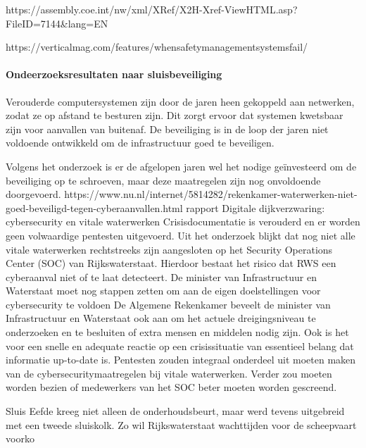 https://assembly.coe.int/nw/xml/XRef/X2H-Xref-ViewHTML.asp?FileID=7144&lang=EN
\cite{fulvio1993safetycriticalsystems}
\cite{dlrtabid}
\cite{knight2010SafetyCritical}
\cite{creavisafecritical}
\cite{valdes2018SafetybyAutomation}

https://verticalmag.com/features/whensafetymanagementsystemsfail/
\cite{2015whensafetymanagementsystemsfail}
\paragraph{Ondeerzoeksresultaten naar sluisbeveiliging}



Verouderde computersystemen zijn door de jaren heen gekoppeld aan netwerken, zodat ze op afstand te besturen zijn. Dit zorgt ervoor dat systemen kwetsbaar zijn voor aanvallen van buitenaf. De beveiliging is in de loop der jaren niet voldoende ontwikkeld om de infrastructuur goed te beveiligen.

Volgens het onderzoek is er de afgelopen jaren wel het nodige geïnvesteerd om de beveiliging op te schroeven, maar deze maatregelen zijn nog onvoldoende doorgevoerd.
https://www.nu.nl/internet/5814282/rekenkamer-waterwerken-niet-goed-beveiligd-tegen-cyberaanvallen.html
\cite{hdsr30092022lichtprojectieswaterliniesluizen}
rapport Digitale dijkverzwaring: cybersecurity en vitale waterwerken 
Crisisdocumentatie is verouderd en er worden geen volwaardige pentesten uitgevoerd. Uit het onderzoek blijkt dat nog niet alle vitale waterwerken rechtstreeks zijn aangesloten op het Security Operations Center (SOC) van Rijkswaterstaat. Hierdoor bestaat het risico dat RWS een cyberaanval niet of te laat detecteert. De minister van Infrastructuur en Waterstaat moet nog stappen zetten om aan de eigen doelstellingen voor cybersecurity te voldoen
De Algemene Rekenkamer beveelt de minister van Infrastructuur en Waterstaat ook aan om het actuele dreigingsniveau te onderzoeken en te besluiten of extra mensen en middelen nodig zijn. Ook is het voor een snelle en adequate reactie op een crisissituatie van essentieel belang dat informatie up-to-date is. Pentesten zouden integraal onderdeel uit moeten maken van de cybersecuritymaatregelen bij vitale waterwerken. Verder zou moeten worden bezien of medewerkers van het SOC beter moeten worden gescreend.

\cite{kramerZeeland}
Sluis Eefde kreeg niet alleen de onderhoudsbeurt, maar werd tevens uitgebreid met een tweede sluiskolk. Zo wil Rijkswaterstaat wachttijden voor de scheepvaart voorko

